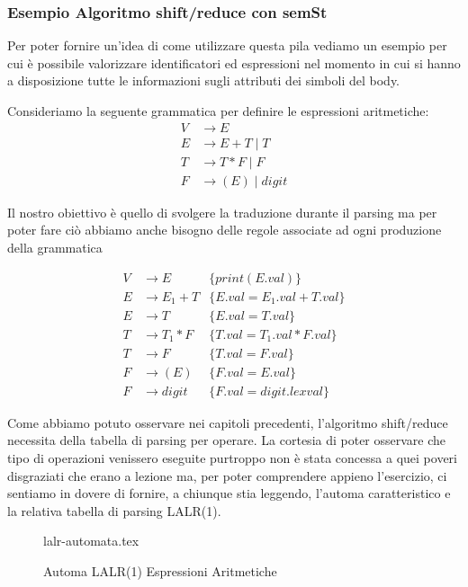 \documentclass[class=book, crop=false, oneside, 12pt]{standalone}
\begin{document}
\subsubsection{Esempio Algoritmo shift/reduce con semSt}

Per poter fornire un'idea di come utilizzare questa pila vediamo un esempio per cui è possibile valorizzare identificatori ed espressioni nel momento in cui si hanno a disposizione tutte le informazioni sugli attributi dei simboli del body. 

Consideriamo la seguente grammatica per definire le espressioni aritmetiche:
\begin{align*}
    V &\to E \\
    E &\to E + T \mid T \\
    T &\to T * F \mid F \\
    F &\to (E) \mid digit
\end{align*}

Il nostro obiettivo è quello di svolgere la traduzione durante il parsing ma per poter fare ciò abbiamo anche bisogno delle regole associate ad ogni produzione della grammatica

\begin{align*}
    V &\to E &\{print(E.val)\} \\
    E &\to E_1 + T &\{E.val = E_1.val + T.val\} \\
    E &\to T &\{E.val = T.val\} \\
    T &\to T_1 * F &\{T.val = T_1.val * F.val\} \\
    T &\to F &\{T.val = F.val\} \\
    F &\to (E) &\{F.val = E.val\} \\
    F &\to digit &\{F.val = digit.lexval\}
\end{align*}

Come abbiamo potuto osservare nei capitoli precedenti, l'algoritmo shift/reduce necessita della tabella di parsing per operare. La cortesia di poter osservare che tipo di operazioni venissero eseguite purtroppo non è stata concessa a quei poveri disgraziati che erano a lezione ma, per poter comprendere appieno l'esercizio, ci sentiamo in dovere di fornire, a chiunque stia leggendo, l'automa caratteristico e la relativa tabella di parsing LALR(1).

\begin{figure}[H]
    \centering
    {lalr-automata.tex}
    \caption{Automa LALR(1) Espressioni Aritmetiche}
\end{figure}
\end{document}
